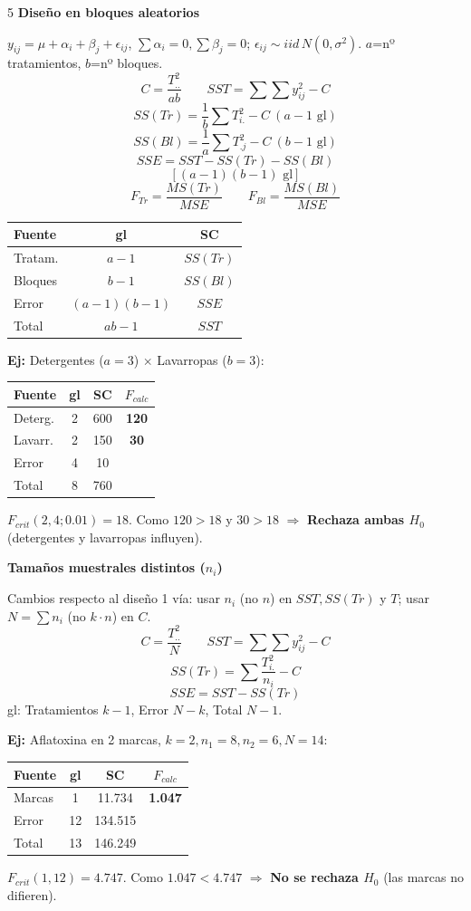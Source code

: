 \documentclass[9pt,a4paper]{article}
\newcommand{\bodysize}{\fontsize{7.5}{8.7}\selectfont}
\newcommand{\notesize}{\fontsize{6.4}{7.4}\selectfont}
\newcommand{\subsize}{\fontsize{8.6}{10}\selectfont\bfseries}
\newcommand{\topic}[2]{\subsize\textcolor{#1!60!black}{#2}\par\vspace{0.5pt}\bodysize}
\newcommand{\ejemplo}[1]{{\notesize\textbf{Ej:} #1\par}\bodysize}
\begin{document}
\begin{multicols}{5}
\topic{green}{Diseño en bloques aleatorios}
$y_{ij}=\mu+\alpha_i+\beta_j+\epsilon_{ij}$, $\sum\alpha_i=0,\sum\beta_j=0$; $\epsilon_{ij}\sim iid\,N(0,\sigma^2)$. $a$=nº tratamientos, $b$=nº bloques.
\[
C=\frac{T_{..}^2}{ab} \qquad SST=\sum\sum y_{ij}^2-C
\]
\[
SS(Tr)=\frac{1}{b}\sum T_{i.}^2-C\ (a{-}1\text{ gl})
\]
\[
SS(Bl)=\frac{1}{a}\sum T_{.j}^2-C\ (b{-}1\text{ gl})
\]
{\notesize
\[
SSE=SST-SS(Tr)-SS(Bl)
\]
\[
[(a{-}1)(b{-}1)\text{ gl}]
\]
}
\[
F_{Tr}=\frac{MS(Tr)}{MSE} \qquad F_{Bl}=\frac{MS(Bl)}{MSE}
\]
\begin{center}
{\notesize
\begin{tabular}{@{}l c c@{}}
\toprule
Fuente & gl & SC \\
\midrule
Tratam. & $a-1$ & $SS(Tr)$ \\
Bloques & $b-1$ & $SS(Bl)$ \\
Error & $(a{-}1)(b{-}1)$ & $SSE$ \\
Total & $ab-1$ & $SST$ \\
\bottomrule
\end{tabular}
}
\end{center}

\ejemplo{Detergentes ($a=3$) $\times$ Lavarropas ($b=3$):
\begin{center}
{\notesize
\setlength{\tabcolsep}{3pt}
\begin{tabular}{@{}l c c c@{}}
\toprule
Fuente & gl & SC & $F_{calc}$ \\
\midrule
Deterg. & 2 & 600 & \textbf{120} \\
Lavarr. & 2 & 150 & \textbf{30} \\
Error & 4 & 10 & \\
\midrule
Total & 8 & 760 & \\
\bottomrule
\end{tabular}
}
\end{center}
$F_{crit}(2,4;0.01)=18$. Como $120>18$ y $30>18$ $\Rightarrow$ \textbf{Rechaza ambas $H_0$} (detergentes y lavarropas influyen).}

\topic{green}{Tamaños muestrales distintos ($n_i$)}
Cambios respecto al diseño 1 vía: usar $n_i$ (no $n$) en $SST,SS(Tr)$ y $T$; usar $N=\sum n_i$ (no $k\cdot n$) en $C$.
\[
C=\frac{T_{..}^2}{N} \qquad SST=\sum\sum y_{ij}^2-C
\]
{\notesize
\[
SS(Tr)=\sum\frac{T_{i.}^2}{n_i}-C
\]
\[
SSE=SST-SS(Tr)
\]
}
gl: Tratamientos $k-1$, Error $N-k$, Total $N-1$.

\ejemplo{Aflatoxina en 2 marcas, $k=2,n_1=8,n_2=6,N=14$:
\begin{center}
{\notesize
\setlength{\tabcolsep}{3pt}
\begin{tabular}{@{}l c c c@{}}
\toprule
Fuente & gl & SC & $F_{calc}$ \\
\midrule
Marcas & 1 & 11.734 & \textbf{1.047} \\
Error & 12 & 134.515 & \\
\midrule
Total & 13 & 146.249 & \\
\bottomrule
\end{tabular}
}
\end{center}
$F_{crit}(1,12)=4.747$. Como $1.047<4.747$ $\Rightarrow$ \textbf{No se rechaza $H_0$} (las marcas no difieren).}


\end{multicols}
\end{document}
